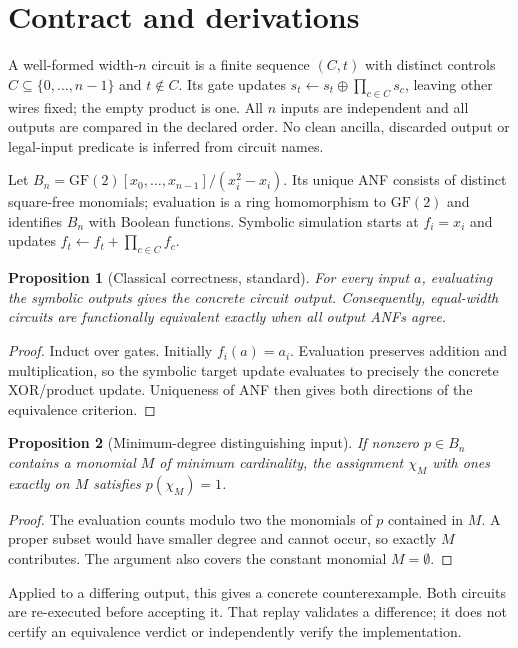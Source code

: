 \documentclass[10pt,a4paper]{article}
\newtheorem{proposition}{Proposition}
\newcommand{\GF}{\mathrm{GF}(2)}
\begin{document}
\section{Contract and derivations}\label{sec:semantics}
A well-formed width-$n$ circuit is a finite sequence $(C,t)$ with distinct controls
$C\subseteq\{0,\ldots,n-1\}$ and $t\notin C$. Its gate updates
$s_t\leftarrow s_t\oplus\prod_{c\in C}s_c$, leaving other wires fixed; the empty product
is one. All $n$ inputs are independent and all outputs are compared in the declared order.
No clean ancilla, discarded output or legal-input predicate is inferred from circuit names.

Let $B_n=\GF[x_0,\ldots,x_{n-1}]/(x_i^2-x_i)$. Its unique ANF consists of distinct
square-free monomials; evaluation is a ring homomorphism to $\GF$ and identifies $B_n$
with Boolean functions. Symbolic simulation starts at $f_i=x_i$ and updates
$f_t\leftarrow f_t+\prod_{c\in C}f_c$.

\begin{proposition}[Classical correctness, standard]
For every input $a$, evaluating the symbolic outputs gives the concrete circuit output.
Consequently, equal-width circuits are functionally equivalent exactly when all output
ANFs agree.
\end{proposition}
\begin{proof}
Induct over gates. Initially $f_i(a)=a_i$. Evaluation preserves addition and multiplication,
so the symbolic target update evaluates to precisely the concrete XOR/product update.
Uniqueness of ANF then gives both directions of the equivalence criterion.
\end{proof}

\begin{proposition}[Minimum-degree distinguishing input]
If nonzero $p\in B_n$ contains a monomial $M$ of minimum cardinality, the assignment
$\chi_M$ with ones exactly on $M$ satisfies $p(\chi_M)=1$.
\end{proposition}
\begin{proof}
The evaluation counts modulo two the monomials of $p$ contained in $M$. A proper subset
would have smaller degree and cannot occur, so exactly $M$ contributes. The argument also
covers the constant monomial $M=\emptyset$.
\end{proof}
Applied to a differing output, this gives a concrete counterexample. Both circuits are
re-executed before accepting it. That replay validates a difference; it does not certify
an equivalence verdict or independently verify the implementation.
\end{document}
